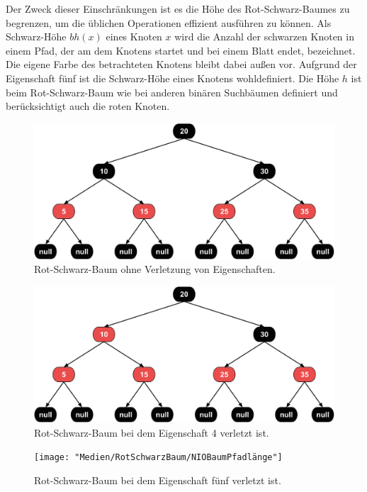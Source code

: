 \documentclass[a4paper,12pt]{article}
\begin{document}
\noindent  Der Zweck dieser Einschränkungen ist es die Höhe des Rot-Schwarz-Baumes zu begrenzen, um die üblichen Operationen effizient ausführen zu können. Als Schwarz-Höhe $\mathit{bh(x)}$ eines Knoten $x$ wird die Anzahl der schwarzen Knoten in einem Pfad, der am dem Knotens startet und bei einem Blatt endet, bezeichnet. Die eigene Farbe des betrachteten Knotens bleibt dabei außen vor. Aufgrund der Eigenschaft fünf ist die Schwarz-Höhe eines Knotens wohldefiniert. Die Höhe $h$ ist beim Rot-Schwarz-Baum wie bei anderen binären Suchbäumen definiert und berücksichtigt auch die roten Knoten. 
\\
\begin{figure}[h]
	\centering
	\includegraphics[width= 1\textwidth]{"Medien/RotSchwarzBaum/IOBaum"}
	\caption{Rot-Schwarz-Baum ohne Verletzung von Eigenschaften. }
	\label{fig:IOBaum}
\end{figure}
\begin{figure}[h]
	\centering
	\includegraphics[width= 1\textwidth]{"Medien/RotSchwarzBaum/NIOBaumZweiRote"}
	\caption{Rot-Schwarz-Baum bei dem Eigenschaft 4 verletzt ist. }
	\label{fig:NIOBaumZweiRote}
\end{figure}
\begin{figure}[h]
	\centering
	\texttt{[image: "Medien/RotSchwarzBaum/NIOBaumPfadlänge"]}
	\caption{Rot-Schwarz-Baum bei dem Eigenschaft fünf verletzt ist.  }
	\label{fig:NIOBaumPfadlänge}
\end{figure}
\end{document}
